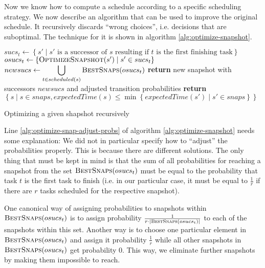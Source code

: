 Now we know how to compute a schedule according to a specific scheduling strategy. We now describe an algorithm that can be used to improve the original schedule. It recursively discards ``wrong choices'', i.e. decisions that are suboptimal. The technique for it is shown in algorithm \ref{alg:optimize-snapshot}.

\begin{algorithm}[t]
  \begin{algorithmic}[5]
    \State $sucs_t \gets \left\{ s' \mid s' \text{ is a successor of } s \text{ resulting if } t \text{ is the first finishing task} \right\}$
    \State $osucs_t \gets \left\{ \Call{OptimizeSnapshot}{s'} \mid s' \in sucs_t \right\}$
    \EndFor
    \State $\displaystyle newsucs \gets \bigcup_{t\in scheduled(s)}  \Call{BestSnaps}{osucs_t} $
    \State \textbf{return} new snapshot with successors $newsucs$ and adjusted transition probabilities
    \label{alg:optimize-snap-adjust-probs}
    \EndProcedure
    \Statex
      \State \textbf{return} $\left\{ s \mid s\in snaps, expectedTime(s) \leq \min\left\{ expectedTime(s')\mid s' \in snaps \right\} \right\}$
    \EndProcedure
  \end{algorithmic}
  \caption{Optimizing a given shapshot recursively}
  \label{alg:optimize-snapshot}
\end{algorithm}

Line \ref{alg:optimize-snap-adjust-probs} of algorithm \ref{alg:optimize-snapshot} needs some explanation: We did not in particular specify how to ``adjust'' the probabilities properly. This is because there are different solutions. The only thing that must be kept in mind is that the sum of all probabilities for reaching a snapshot from the set $\Call{BestSnaps}{osucs_t}$ must be equal to the probability that task $t$ is the first task to finish (i.e. in our particular case, it must be equal to $\frac{1}{r}$ if there are $r$ tasks scheduled for the respective snapshot).

One canonical way of assigning probabilities to snapshots within $\Call{BestSnaps}{osucs_t}$ is to assign probability $\frac{1}{r\cdot|\Call{BestSnaps}{osucs_t}|}$ to each of the snapshots within this set. Another way is to choose one particular element in $\Call{BestSnaps}{osucs_t}$ and assign it probability $\frac{1}{r}$ while all other snapshots in $\Call{BestSnaps}{osucs_t}$ get probability 0. This way, we eliminate further snapshots by making them impossible to reach.

